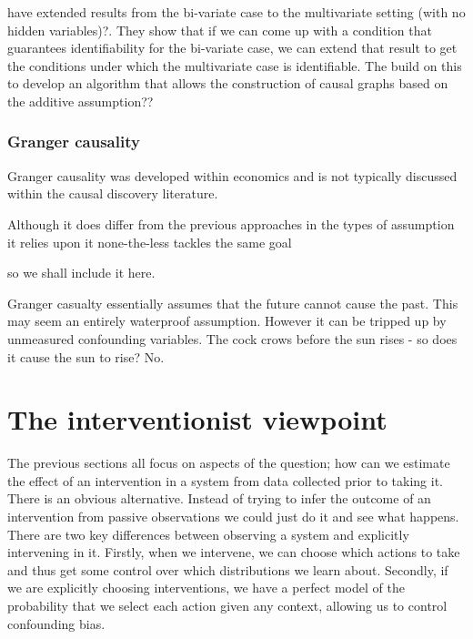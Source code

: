 \documentclass[11pt,a4paper,oneside]{book}
\theoremstyle{plain}
\theoremstyle{definition}
\begin{document}
\citep{Peters2014} have extended results from the bi-variate case to the multivariate setting (with no hidden variables)?. They show that if we can come up with a condition that guarantees identifiability for the bi-variate case, we can extend that result to get the conditions under which the multivariate case is identifiable. The build on this to develop an algorithm that allows the construction of causal graphs based on the additive assumption??

\subsection{Granger causality}

Granger causality was developed within economics and is not typically discussed within the causal discovery literature.  

Although it does differ from the previous approaches in the types of assumption it relies upon it none-the-less tackles the same goal 

so we shall include it here. 

Granger casualty essentially assumes that the future cannot cause the past. This may seem an entirely waterproof assumption. However it can be tripped up by unmeasured confounding variables. The cock crows before the sun rises - so does it cause the sun to rise? No. 



\chapter{The interventionist viewpoint}

The previous sections all focus on aspects of the question; how can we estimate the effect of an intervention in a system from data collected prior to taking it. There is an obvious alternative. Instead of trying to infer the outcome of an intervention from passive observations we could just do it and see what happens. There are two key differences between observing a system and explicitly intervening in it. Firstly, when we intervene, we can choose which actions to take and thus get some control over which distributions we learn about. Secondly, if we are explicitly choosing interventions, we have a perfect model of the probability that we select each action given any context, allowing us to control confounding bias. 
\end{document}
